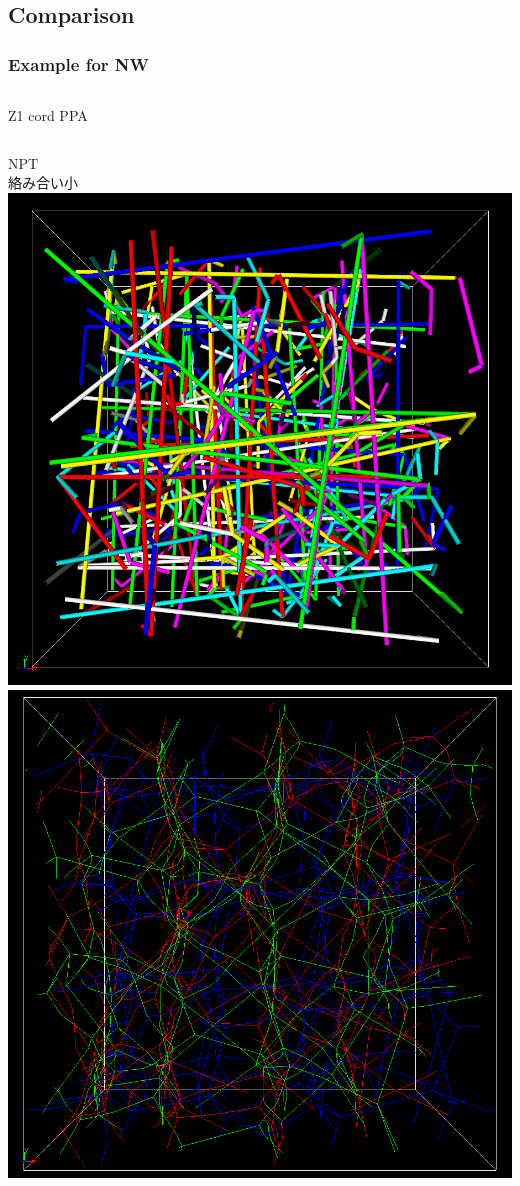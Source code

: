 \documentclass[12pt, dvipdfmx]{beamer}
\begin{document}
\subsection{Comparison}
\begin{frame}
    \frametitle{Example for NW}
    \begin{columns}[T, onlytextwidth]
        \centering
            Z1 cord
        \centering
            PPA
    \end{columns}
    \begin{columns}[c, onlytextwidth]
        NPT\\
        絡み合い小
        \centering
            \includegraphics[width=.8\textwidth]{z_cord_NPT_4Chain.png}
        \centering
            \includegraphics[width=.8\textwidth]{NPT_PPA.png}

\end{columns}
\end{frame}
\end{document}
